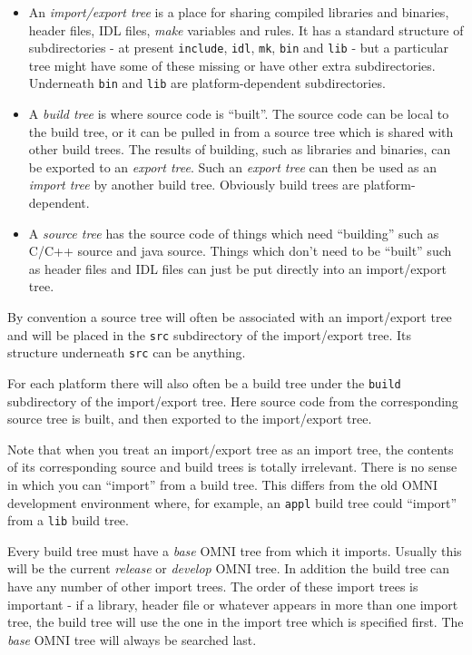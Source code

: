 \documentclass[11pt]{article}
\begin{document}
\begin{itemize}

\item An {\em import/export tree} is a place for sharing compiled libraries and
binaries, header files, IDL files, {\em make} variables and rules.  It has a
standard structure of subdirectories - at present {\tt include}, {\tt idl},
{\tt mk}, {\tt bin} and {\tt lib} - but a particular tree might have some of
these missing or have other extra subdirectories.  Underneath {\tt bin} and
{\tt lib} are platform-dependent subdirectories.

\item A {\em build tree} is where source code is ``built''.  The source code
can be local to the build tree, or it can be pulled in from a source tree which
is shared with other build trees.  The results of building, such as libraries
and binaries, can be exported to an {\em export tree}.  Such an {\em export
tree} can then be used as an {\em import tree} by another build tree.
Obviously build trees are platform-dependent.

\item A {\em source tree} has the source code of things which need ``building''
such as C/C++ source and java source.  Things which don't need to be ``built''
such as header files and IDL files can just be put directly into an
import/export tree.

\end{itemize}

By convention a source tree will often be associated with an import/export
tree and will be placed in the {\tt src} subdirectory of the import/export
tree.  Its structure underneath {\tt src} can be anything.

For each platform there will also often be a build tree under the {\tt build}
subdirectory of the import/export tree.  Here source code from the
corresponding source tree is built, and then exported to the import/export
tree.

Note that when you treat an import/export tree as an import tree, the contents
of its corresponding source and build trees is totally irrelevant.  There is no
sense in which you can ``import'' from a build tree.  This differs from the old
OMNI development environment where, for example, an {\tt appl} build tree could
``import'' from a {\tt lib} build tree.

Every build tree must have a {\em base} OMNI tree from which it imports.
Usually this will be the current {\em release} or {\em develop} OMNI tree.  In
addition the build tree can have any number of other import trees.  The order
of these import trees is important - if a library, header file or whatever
appears in more than one import tree, the build tree will use the one in the
import tree which is specified first.  The {\em base} OMNI tree will always be
searched last.
\end{document}
